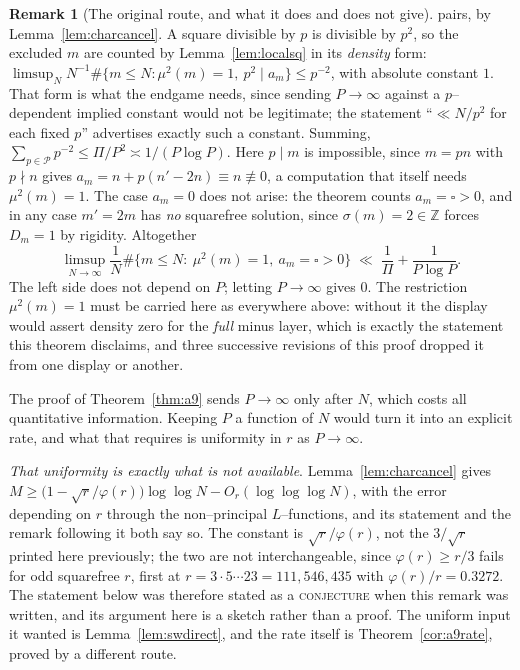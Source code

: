 \documentclass[11pt]{article}
\theoremstyle{definition}
\newtheorem{remark}[theorem]{Remark}
\begin{document}
\begin{remark}[The original route, and what it does and does not give]
pairs, by Lemma~\ref{lem:charcancel}. A square divisible by $p$ is divisible by $p^2$, so the excluded $m$ are counted by
Lemma~\ref{lem:localsq} in its \emph{density} form: $\limsup_NN^{-1}\#\{m\le N:\mu^2(m)=1,\
p^2\mid a_m\}\le p^{-2}$, with absolute constant $1$. That form is what the endgame needs, since
sending $P\to\infty$ against a $p$--dependent implied constant would not be legitimate; the
statement ``$\ll N/p^2$ for each fixed $p$'' advertises exactly such a constant. Summing, $\sum_{p\in\mathcal{P}}p^{-2}\le\Pi/P^2\asymp1/(P\log P)$. Here
$p\mid m$ is impossible, since $m=pn$ with $p\nmid n$ gives $a_m=n+p(n'-2n)\equiv n\not\equiv0$,
a computation that itself needs $\mu^2(m)=1$. The case $a_m=0$ does not arise: the theorem counts $a_m=\square>0$, and in any case
$m'=2m$ has \emph{no} squarefree solution, since $\sigma(m)=2\in\mathbb{Z}$ forces $D_m=1$ by
rigidity. Altogether
\[ \limsup_{N\to\infty}\frac1N\#\{m\le N:\ \mu^2(m)=1,\ a_m=\square>0\}\;\ll\;\frac1\Pi+\frac1{P\log P}. \]
The left side does not depend on $P$; letting $P\to\infty$ gives $0$. The restriction $\mu^2(m)=1$
must be carried here as everywhere above: without it the display would assert density zero for the
\emph{full} minus layer, which is exactly the statement this theorem disclaims, and three successive
revisions of this proof dropped it from one display or another.
\end{remark}

The proof of Theorem~\ref{thm:a9} sends $P\to\infty$ only after $N$, which costs all quantitative
information. Keeping $P$ a function of $N$ would turn it into an explicit rate, and what that
requires is uniformity in $r$ as $P\to\infty$.

\emph{That uniformity is exactly what is not available}. Lemma~\ref{lem:charcancel} gives
$M\ge\bigl(1-\sqrt r/\varphi(r)\bigr)\log\log N-O_r(\log\log\log N)$, with the error depending on
$r$ through the non--principal $L$--functions, and its statement and the remark following it both say so. The constant is $\sqrt r/\varphi(r)$, not the $3/\sqrt r$ printed here previously; the two
are not interchangeable, since $\varphi(r)\ge r/3$ fails for odd squarefree $r$, first at
$r=3\cdot5\cdots23=111{,}546{,}435$ with $\varphi(r)/r=0.3272$. The statement below was therefore
stated as a \textsc{conjecture} when this remark was written, and its argument here is a sketch
rather than a proof. The uniform input it wanted is Lemma~\ref{lem:swdirect}, and the rate itself is
Theorem~\ref{cor:a9rate}, proved by a different route.
\end{document}
